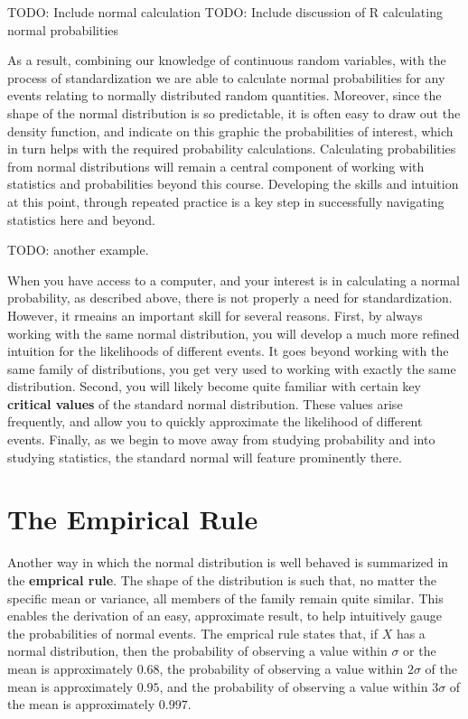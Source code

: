 \documentclass[
  letterpaper,
  DIV=11,
  numbers=noendperiod]{scrreprt}
\begin{document}
TODO: Include normal calculation TODO: Include discussion of R
calculating normal probabilities

As a result, combining our knowledge of continuous random variables,
with the process of standardization we are able to calculate normal
probabilities for any events relating to normally distributed random
quantities. Moreover, since the shape of the normal distribution is so
predictable, it is often easy to draw out the density function, and
indicate on this graphic the probabilities of interest, which in turn
helps with the required probability calculations. Calculating
probabilities from normal distributions will remain a central component
of working with statistics and probabilities beyond this course.
Developing the skills and intuition at this point, through repeated
practice is a key step in successfully navigating statistics here and
beyond.

TODO: another example.

When you have access to a computer, and your interest is in calculating
a normal probability, as described above, there is not properly a need
for standardization. However, it rmeains an important skill for several
reasons. First, by always working with the same normal distribution, you
will develop a much more refined intuition for the likelihoods of
different events. It goes beyond working with the same family of
distributions, you get very used to working with exactly the same
distribution. Second, you will likely become quite familiar with certain
key \textbf{critical values} of the standard normal distribution. These
values arise frequently, and allow you to quickly approximate the
likelihood of different events. Finally, as we begin to move away from
studying probability and into studying statistics, the standard normal
will feature prominently there.

\section{The Empirical Rule}\label{the-empirical-rule}

Another way in which the normal distribution is well behaved is
summarized in the \textbf{emprical rule}. The shape of the distribution
is such that, no matter the specific mean or variance, all members of
the family remain quite similar. This enables the derivation of an easy,
approximate result, to help intuitively gauge the probabilities of
normal events. The emprical rule states that, if \(X\) has a normal
distribution, then the probability of observing a value within
\(\sigma\) or the mean is approximately \(0.68\), the probability of
observing a value within \(2\sigma\) of the mean is approximately
\(0.95\), and the probability of observing a value within \(3\sigma\) of
the mean is approximately \(0.997\).
\end{document}
